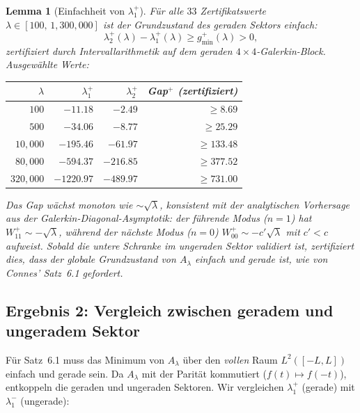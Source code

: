 ﻿\documentclass[12pt,a4paper]{article}
\newtheorem{lemma}[theorem]{Lemma}
\theoremstyle{definition}
\theoremstyle{remark}
\begin{document}
\begin{lemma}[Einfachheit von $\lambda_1^+$]
\label{lem:simplicity}
Für alle $33$ Zertifikatswerte $\lambda \in [100,\, 1{,}300{,}000]$ ist der Grundzustand des geraden Sektors einfach:
\[
  \lambda_2^+(\lambda) - \lambda_1^+(\lambda) \geq g_{\min}^+(\lambda) > 0,
\]
zertifiziert durch Intervallarithmetik auf dem geraden $4 \times 4$-Galerkin-Block. Ausgewählte Werte:

\medskip
\begin{center}
\renewcommand{\arraystretch}{1.15}
\begin{tabular}{r|r|r|r}
$\lambda$ & $\lambda_1^+$ & $\lambda_2^+$ & Gap$^+$ (zertifiziert) \\\hline
$100$ & $-11.18$ & $-2.49$ & $\geq 8.69$ \\
$500$ & $-34.06$ & $-8.77$ & $\geq 25.29$ \\
$10{,}000$ & $-195.46$ & $-61.97$ & $\geq 133.48$ \\
$80{,}000$ & $-594.37$ & $-216.85$ & $\geq 377.52$ \\
$320{,}000$ & $-1220.97$ & $-489.97$ & $\geq 731.00$
\end{tabular}
\end{center}

\medskip\noindent
Das Gap wächst monoton wie $\sim\!\sqrt{\lambda}$, konsistent mit der analytischen Vorhersage aus der Galerkin-Diagonal-Asymptotik: der führende Modus ($n = 1$) hat $W_{11}^+ \sim -\sqrt{\lambda}$, während der nächste Modus ($n = 0$) $W_{00}^+ \sim -c'\sqrt{\lambda}$ mit $c' < c$ aufweist. Sobald die untere Schranke im ungeraden Sektor validiert ist, zertifiziert dies, dass der globale Grundzustand von $A_\lambda$ einfach und gerade ist, wie von Connes' Satz~6.1 gefordert.
\end{lemma}

\subsection{Ergebnis 2: Vergleich zwischen geradem und ungeradem Sektor}

Für Satz~6.1 muss das Minimum von $A_\lambda$ über den \emph{vollen} Raum $L^2([-L,L])$ einfach und gerade sein. Da $A_\lambda$ mit der Parität kommutiert ($f(t)\mapsto f(-t)$), entkoppeln die geraden und ungeraden Sektoren. Wir vergleichen $\lambda_1^+$ (gerade) mit $\lambda_1^-$ (ungerade):
\end{document}
